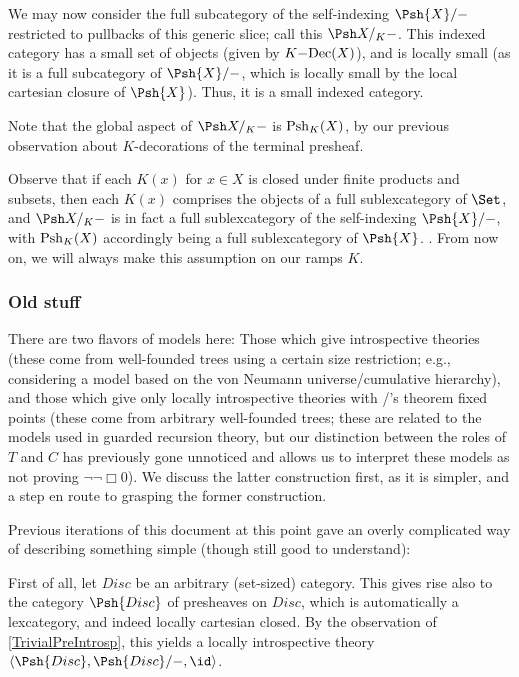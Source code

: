 We may now consider the full subcategory of the self-indexing $\Psh{X}/-$ restricted to pullbacks of this generic slice; call this $\KFiberPsh{K}{X}$. This indexed category has a small set of objects (given by $K\mathrm{-Dec}(X)$), and is locally small (as it is a full subcategory of $\Psh{X}/-$, which is locally small by the local cartesian closure of $\Psh{X}$). Thus, it is a small indexed category.

Note that the global aspect of $\KFiberPsh{K}{X}$ is $\operatorname{Psh}_{K}(X)$, by our previous observation about $K$-decorations of the terminal presheaf.

Observe that if each $K(x)$ for $x \in X$ is closed under finite products and subsets, then each $K(x)$ comprises the objects of a full sublexcategory of $\Set$, and $\KFiberPsh{K}{X}$ is in fact a full sublexcategory of the self-indexing $\Psh{X}/-$, with $\operatorname{Psh}_{K}(X)$ accordingly being a full sublexcategory of $\Psh{X}$. . From now on, we will always make this assumption on our ramps $K$.

\TODO

\subsubsection{Old stuff}

There are two flavors of models here: Those which give introspective theories (these come from well-founded trees using a certain size restriction; e.g., considering a model based on the von Neumann universe/cumulative hierarchy), and those which give only locally introspective theories with \Loeb/'s theorem fixed points (these come from arbitrary well-founded trees; these are related to the models used in guarded recursion theory, but our distinction between the roles of $T$ and $C$ has previously gone unnoticed and allows us to interpret these models as not proving $\lnot \lnot \Box 0$). We discuss the latter construction first, as it is simpler, and a step en route to grasping the former construction.

Previous iterations of this document at this point gave an overly complicated way of describing something simple (though still good to understand):

First of all, let $Disc$ be an arbitrary (set-sized) category. This gives rise also to the category $\Psh{Disc}$ of presheaves on $Disc$, which is automatically a lexcategory, and indeed locally cartesian closed. By the observation of \cref{TrivialPreIntrosp}, this yields a locally introspective theory $\langle \Psh{Disc}, \Psh{Disc}/-, \id \rangle$.

